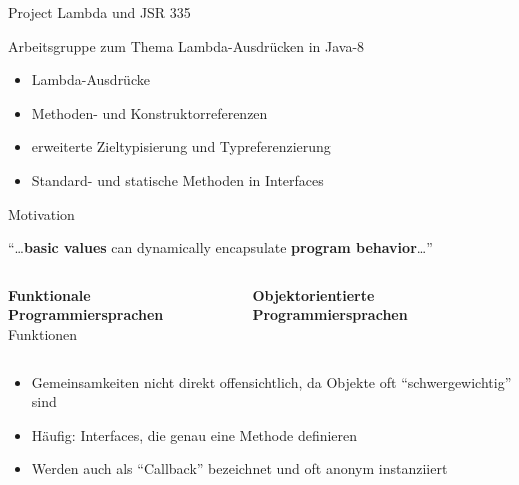 \begin{frame}[fragile]{Project Lambda und JSR 335}

    Arbeitsgruppe zum Thema Lambda-Ausdrücken in Java-8 \\ 
    
    \pause
    \begin{itemize}
        \item<2-> Lambda-Ausdrücke
        \item<3-> Methoden- und Konstruktorreferenzen
        \item<4-> erweiterte Zieltypisierung und Typreferenzierung
        \item<5-> Standard- und statische Methoden in Interfaces
    \end{itemize}
\end{frame}

\begin{frame}[fragile]{Motivation}

    \centering
    \begin{minipage}[b]{0.75\textwidth}

        \begin{block}{\citet{goetz13}}
            \enquote{\dots \textbf{basic values} can dynamically encapsulate
                \textbf{program behavior}\dots}
        \end{block}

        \pause

        \begin{columns}[T,onlytextwidth]
            \textbf{Funktionale Programmiersprachen}\\
            Funktionen

            \pause

            \textbf{Objektorientierte Programmiersprachen}\\

        \end{columns}

    \end{minipage}
    
    \begin{itemize}
        \item<5-> Gemeinsamkeiten nicht direkt offensichtlich, da Objekte oft
              \enquote{schwergewichtig} sind
        \item<6-> Häufig: Interfaces, die genau eine Methode definieren
        \item<7-> Werden auch als \enquote{Callback} bezeichnet und oft anonym instanziiert
    \end{itemize}
\end{frame}
